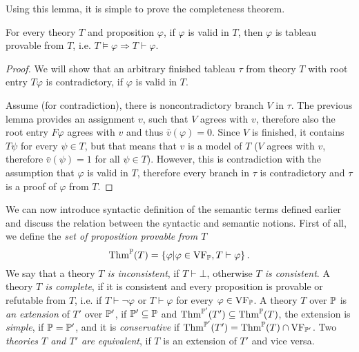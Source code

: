 Using this lemma, it is simple to prove the completeness theorem.

\begin{theorem}
For every theory $T$ and proposition $\varphi$, if $\varphi$ is valid in $T$, then $\varphi$ is tableau provable from $T$, i.e. $T \vDash \varphi \Rightarrow T \vdash \varphi$.
\end{theorem}
\begin{proof}
We will show that an arbitrary finished tableau $\tau$ from theory $T$ with root entry $T \varphi$ is contradictory, if $\varphi$ is valid in $T$.

Assume (for contradiction), there is noncontradictory branch $V$ in $\tau$. The previous lemma provides an assignment $v$, such that $V$ agrees with $v$, therefore also the root entry $F \varphi$ agrees with $v$ and thus $\bar{v}(\varphi) = 0$. Since $V$ is finished, it contains $T \psi$ for every $\psi \in T$, but that means that $v$ is a model of $T$ ($V$ agrees with $v$, therefore $\bar{v}(\psi) = 1$ for all $\psi \in T$). However, this is contradiction with the assumption that $\varphi$ is valid in $T$, therefore every branch in $\tau$ is contradictory and $\tau$ is a proof of $\varphi$ from $T$. 
\end{proof}

We can now introduce syntactic definition of the semantic terms defined earlier and discuss the relation between the syntactic and semantic notions. First of all, we define the \emph{set of proposition provable from $T$} $$\operatorname{Thm}^\mathbb{P}(T) = \{\varphi | \varphi \in \operatorname{VF}_\mathbb{P}, T \vdash \varphi\}\,.$$ We say that a theory \emph{$T$ is inconsistent}, if $T \vdash \bot$, otherwise \emph{$T$ is consistent}. A theory \emph{$T$ is complete}, if it is consistent and every proposition is provable or refutable from $T$, i.e. if $T \vdash \neg \varphi$ or $T \vdash \varphi$ for every $\varphi \in \operatorname{VF}_\mathbb{P}$. A theory $T$ over $\mathbb{P}$ is \emph{an extension} of $T'$ over $\mathbb{P}'$, if $\mathbb{P}' \subseteq \mathbb{P}$ and $\operatorname{Thm}^{\mathbb{P}'}(T') \subseteq \operatorname{Thm}^{\mathbb{P}}(T)$, the extension is \emph{simple}, if $\mathbb{P} = \mathbb{P}'$, and it is \emph{conservative} if $\operatorname{Thm}^{\mathbb{P}'}(T') = \operatorname{Thm}^{\mathbb{P}}(T) \cap \operatorname{VF}_{\mathbb{P}'}$. Two \emph{theories $T$ and $T'$ are equivalent}, if $T$ is an extension of $T'$ and vice versa.

